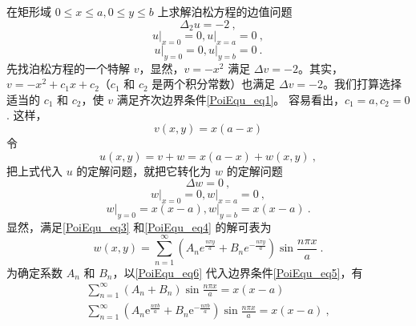 \begin{example}{}
    在矩形域 $0\leq x\leq a, 0\leq y\leq b$ 上求解泊松方程的边值问题
    \begin{equation}
        \Delta_{2} u=-2~,
    \end{equation}
    \begin{equation} \label{PoiEqu_eq1}
        \left.u\right|_{x=0}=0,\left.u\right|_{x=a}=0~,
    \end{equation}
    \begin{equation}\label{PoiEqu_eq2}
        \left.u\right|_{y=0}=0,\left.u\right|_{y=b}=0~.
    \end{equation}
    先找泊松方程的一个特解 $v$，显然，$v=-x^2$ 满足 $\Delta v =-2$。其实，$v=-x^2+c_1x+c_2$（$c_1$ 和 $c_2$ 是两个积分常数）也满足 $\Delta v = -2$。我们打算选择适当的 $c_1$ 和 $c_2$，使 $v$ 满足齐次边界条件\autoref{PoiEqu_eq1}。 容易看出，$c_1=a,c_2 = 0$.
    这样，
    \begin{equation}
        v(x,y) = x(a-x)
    \end{equation}
    令
    \begin{equation}
        u(x,y)=v+w=x(a-x)+w(x,y)~,
    \end{equation}
    把上式代入 $u$ 的定解问题，就把它转化为 $w $ 的定解问题
    \begin{equation} \label{PoiEqu_eq3}
        \Delta w =0~,
    \end{equation}
    \begin{equation} \label{PoiEqu_eq4}
        \left.w\right|_{x=0}=0,\left.w\right|_{x=a}=0~,
    \end{equation}
    \begin{equation} \label{PoiEqu_eq5}
        \left.w\right|_{y=0}=x(x-a),\left.w\right|_{y=b}=x(x-a)~.
    \end{equation}
    显然，满足\autoref{PoiEqu_eq3} 和\autoref{PoiEqu_eq4} 的解可表为
    \begin{equation} \label{PoiEqu_eq6}
        w(x, y)=\sum_{n=1}^{\infty}\left(A_{n} e^{\frac{n \pi y}{a}}+B_{n} e^{-\frac{n \pi y}{a}}\right) \sin \frac{n \pi x}{a}~.
    \end{equation}
    为确定系数 $A_n$ 和 $B_n$，以\autoref{PoiEqu_eq6} 代入边界条件\autoref{PoiEqu_eq5}，有
    \begin{equation}  \label{PoiEqu_eq7}
        \begin{array}{l}\sum_{n=1}^{\infty}\left(A_{n}+B_{n}\right) \sin \frac{n \pi x}{a}=x(x-a) \\ \sum_{n=1}^{\infty}\left(A_{n} \mathrm{e}^{\frac{n \pi b}{a}}+B_{n} \mathrm{e}^{-\frac{n \pi b}{a}}\right) \sin \frac{n \pi x}{a}=x(x-a)~,\end{array}

\end{equation}
\end{example}
